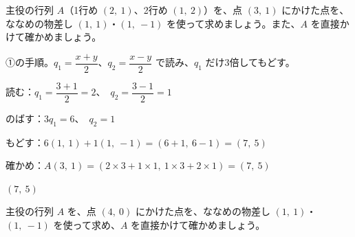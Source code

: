 
\begin{reidai}[ななめの物差しで点を変換する]
主役の行列 $A$（1行め $(2,\ 1)$、2行め $(1,\ 2)$）を、点 $(3,\ 1)$ にかけた点を、ななめの物差し $(1,\ 1)$・$(1,\ -1)$ を使って求めましょう。また、$A$ を直接かけて確かめましょう。\par
\kangaekata ①の手順。$q_1=\dfrac{x+y}{2}$、$q_2=\dfrac{x-y}{2}$ で読み、$q_1$ だけ3倍してもどす。\par
\shiki\kviijs{}\zw{} 読む：$q_1=\dfrac{3+1}{2}=2$、\ $q_2=\dfrac{3-1}{2}=1$\par
\kviija のばす：$3q_1=6$、\ $q_2=1$\par
\kviija もどす：$6(1,\ 1)+1(1,\ -1)=(6+1,\ 6-1)=(7,\ 5)$\par
\kviija 確かめ：$A(3,\ 1)=(2\times3+1\times1,\ 1\times3+2\times1)=(7,\ 5)$\par
\kotae\kviijs{}\zw{} $(7,\ 5)$
\end{reidai}

\begin{jibun}
主役の行列 $A$ を、点 $(4,\ 0)$ にかけた点を、ななめの物差し $(1,\ 1)$・$(1,\ -1)$ を使って求め、$A$ を直接かけて確かめましょう。
\end{jibun}

